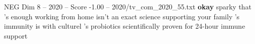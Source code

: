 \begin{textsample}{NEG Dim 8 – 2020 – Score -1.00 – 2020/tv\_com\_2020\_55.txt}  \label{ex:f8_neg_071}
\textbf{okay} sparky that 's enough working from home isn't an exact science supporting your family 's immunity is with culturel 's probiotics scientifically proven for 24-hour immune support

\end{textsample}
